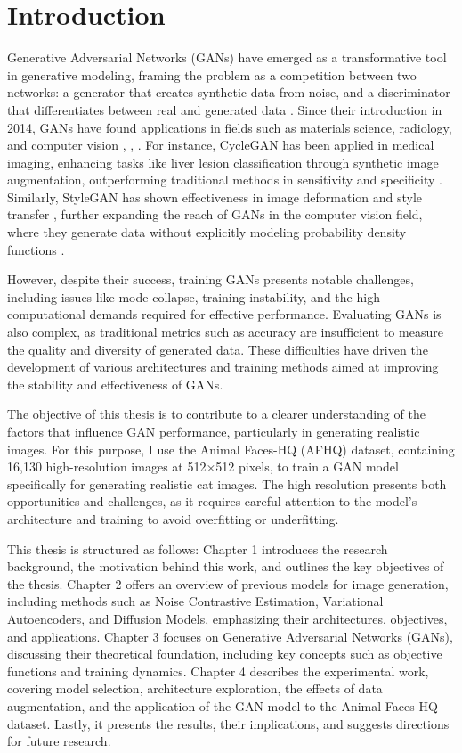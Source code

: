 \chapter{Introduction}


Generative Adversarial Networks (GANs) have emerged as a transformative tool in generative modeling, framing the problem as a competition between two networks: a generator that creates synthetic data from noise, and a discriminator that differentiates between real and generated data \citep{10.48550/arxiv.1704.00028}. Since their introduction in 2014, GANs have found applications in fields such as materials science, radiology, and computer vision \citep{10.1002/mgea.30}, \citep{10.1016/j.media.2019.101552}, \citep{10.1016/j.artmed.2020.101938}. For instance, CycleGAN has been applied in medical imaging, enhancing tasks like liver lesion classification through synthetic image augmentation, outperforming traditional methods in sensitivity and specificity \citep{10.1016/j.neucom.2018.09.013}. Similarly, StyleGAN has shown effectiveness in image deformation and style transfer \citep{10.1109/iccv.2019.00453}, further expanding the reach of GANs in the computer vision field, where they generate data without explicitly modeling probability density functions \citep{10.1016/j.media.2019.101552}.

However, despite their success, training GANs presents notable challenges, including issues like mode collapse, training instability, and the high computational demands required for effective performance. Evaluating GANs is also complex, as traditional metrics such as accuracy are insufficient to measure the quality and diversity of generated data. These difficulties have driven the development of various architectures and training methods aimed at improving the stability and effectiveness of GANs.

The objective of this thesis is to contribute to a clearer understanding of the factors that influence GAN performance, particularly in generating realistic images. For this purpose, I use the Animal Faces-HQ (AFHQ) dataset, containing 16,130 high-resolution images at 512×512 pixels, to train a GAN model specifically for generating realistic cat images. The high resolution presents both opportunities and challenges, as it requires careful attention to the model’s architecture and training to avoid overfitting or underfitting.

This thesis is structured as follows: Chapter 1 introduces the research background, the motivation behind this work, and outlines the key objectives of the thesis. Chapter 2 offers an overview of previous models for image generation, including methods such as Noise Contrastive Estimation, Variational Autoencoders, and Diffusion Models, emphasizing their architectures, objectives, and applications. Chapter 3 focuses on Generative Adversarial Networks (GANs), discussing their theoretical foundation, including key concepts such as objective functions and training dynamics. Chapter 4 describes the experimental work, covering model selection, architecture exploration, the effects of data augmentation, and the application of the GAN model to the Animal Faces-HQ dataset. Lastly, it presents the results, their implications, and suggests directions for future research.